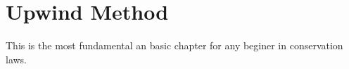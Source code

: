 %

\chapter{Upwind Method}
This is the most fundamental an basic chapter for any beginer in conservation laws.

%

